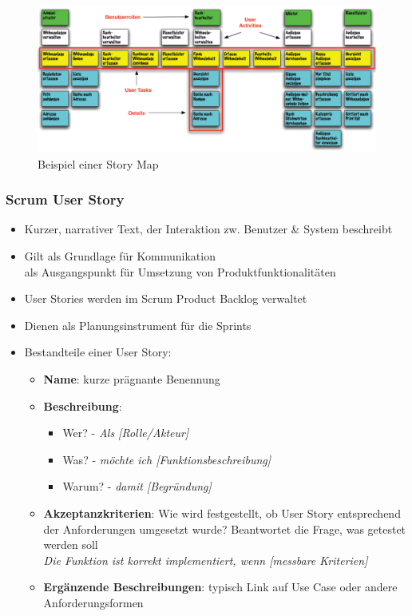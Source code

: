 \documentclass[a4paper]{article}
\begin{document}
			\begin{figure}[!htb]
				\centering
				\includegraphics[width=.9\textwidth]{img/re/05/story_map.png}
				\caption{Beispiel einer Story Map}
				\label{fig:re_story_map}
			\end{figure}
		
			\subsubsection{Scrum User Story}
			
			\begin{itemize}
				\item Kurzer, narrativer Text, der Interaktion zw. Benutzer \& System beschreibt
				\item Gilt als Grundlage für Kommunikation\\ 
						als Ausgangspunkt für Umsetzung von Produktfunktionalitäten
				\item User Stories werden im Scrum Product Backlog verwaltet
				\item Dienen als Planungsinstrument für die Sprints
				
				\item Bestandteile einer User Story:
					\begin{itemize}
						\item \textbf{Name}: kurze prägnante Benennung
						\item \textbf{Beschreibung}:
							\begin{itemize}
								\item Wer? - \textit{Als [Rolle/Akteur]}
								\item Was? - \textit{möchte ich [Funktionsbeschreibung]}
								\item Warum? - \textit{damit [Begründung]}
							\end{itemize}
						\item \textbf{Akzeptanzkriterien}: Wie wird festgestellt, ob User Story entsprechend der Anforderungen umgesetzt wurde?
						Beantwortet die Frage, was getestet werden soll\\
						\textit{Die Funktion ist korrekt implementiert, wenn [messbare Kriterien]}
						\item \textbf{Ergänzende Beschreibungen}: typisch Link auf Use Case oder andere Anforderungsformen
					\end{itemize}
			\end{itemize}
		
\end{document}
